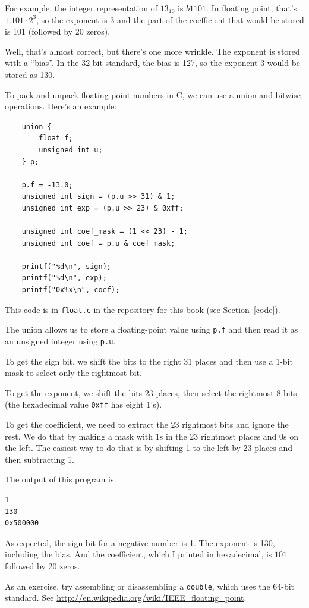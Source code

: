 \documentclass[12pt]{book}
\begin{document}
{For example, the integer representation of $13_{10}$ is $b1101$.
In floating point, that's $1.101 \cdot 2^3$, so the exponent
is 3 and the part of the coefficient that would be stored
is 101 (followed by 20 zeros).

Well, that's almost correct, but there's one more wrinkle.
The exponent is stored with a ``bias''.  In the 32-bit standard,
the bias is 127, so the exponent 3 would be stored as 130.

To pack and unpack floating-point numbers in C, we can use a 
union and bitwise operations.  Here's an example:
%
\begin{verbatim}
    union {
        float f;
        unsigned int u;
    } p;

    p.f = -13.0;
    unsigned int sign = (p.u >> 31) & 1;
    unsigned int exp = (p.u >> 23) & 0xff;

    unsigned int coef_mask = (1 << 23) - 1;
    unsigned int coef = p.u & coef_mask;

    printf("%d\n", sign);
    printf("%d\n", exp);
    printf("0x%x\n", coef);
\end{verbatim}
%
This code is in {\tt float.c} in the repository for this
book (see Section~\ref{code}).

The union allows us to store a floating-point value using
{\tt p.f} and then read it as an unsigned integer using
{\tt p.u}.

To get the sign bit, we shift the bits to the right 31
places and then use a 1-bit mask to select only the
rightmost bit.

To get the exponent, we shift the bits 23 places, then select the
rightmost 8 bits (the hexadecimal value {\tt 0xff} has eight 1's).

To get the coefficient, we need to extract the 23 rightmost bits
and ignore the rest.  We do that by making a mask with 1s in the
23 rightmost places and 0s on the left.  The easiest way to do that
is by shifting 1 to the left by 23 places and then subtracting 1.  

The output of this program is:
%
\begin{verbatim}
1
130
0x500000
\end{verbatim}
%
As expected, the sign bit for a negative number is 1.  The exponent 
is 130, including the bias.  And the coefficient, which I printed in
hexadecimal, is $101$ followed by 20 zeros.

As an exercise, try assembling or disassembling a {\tt double}, which
uses the 64-bit standard.  See
\url{http://en.wikipedia.org/wiki/IEEE_floating_point}.


}
\end{document}
